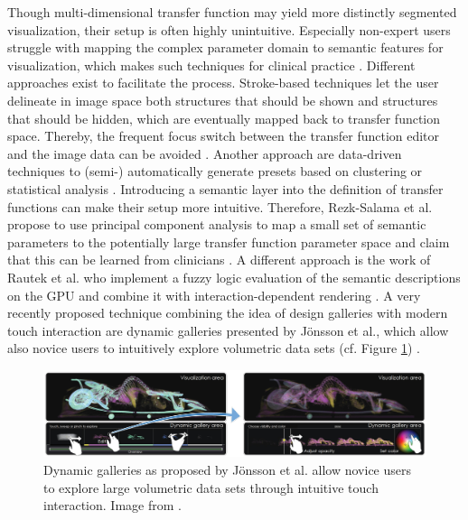 Though multi-dimensional transfer function may yield more distinctly segmented visualization, their setup is often highly unintuitive.
Especially non-expert users struggle with mapping the complex parameter domain to semantic features for visualization, which makes such techniques  for clinical practice \cite{Salama:2006:SemanticTf}.
Different approaches exist to facilitate the process.
Stroke-based techniques let the user delineate in image space both structures that should be shown and structures that should be hidden, which are eventually mapped back to transfer function space.
Thereby, the frequent focus switch between the transfer function editor and the image data can be avoided \cite{Tzeng:2003:NovelInterface, Ropinski:2008:StrokeBasedTf}.
Another approach are data-driven techniques to (semi-) automatically generate presets based on clustering or statistical analysis \cite{RezkSalama:2000:AutomaticAdjustment, Patel:2009:MomentCurves}.
Introducing a semantic layer into the definition of transfer functions can make their setup more intuitive.
Therefore, Rezk-Salama et al. propose to use principal component analysis to map a small set of semantic parameters to the potentially large transfer function parameter space and claim that this can be learned from clinicians \cite{Salama:2006:SemanticTf}.
A different approach is the work of Rautek et al. who implement a fuzzy logic evaluation of the semantic descriptions on the GPU and combine it with interaction-dependent rendering \cite{Rautek:2008:SemanticsForIllustrativeVr}.
A very recently proposed technique combining the idea of design galleries \cite{Marks:1997:DesignGalleries} with modern touch interaction are dynamic galleries presented by Jönsson et al., which allow also novice users to intuitively explore volumetric data sets (cf. Figure \ref{fig:background:joensson-dynamicgalleries}) \cite{Jonsson:2016:DynamicGalleries}.
\begin{figure}[ht]
	\centering
	\includegraphics[width=0.9\linewidth]{figures/background/joensson-dynamicgalleries.jpg}
	\caption{
		Dynamic galleries as proposed by Jönsson et al. allow novice users to explore large volumetric data sets through intuitive touch interaction. Image from \cite{Jonsson:2016:DynamicGalleries}.
	}
	\label{fig:background:joensson-dynamicgalleries}
\end{figure}



